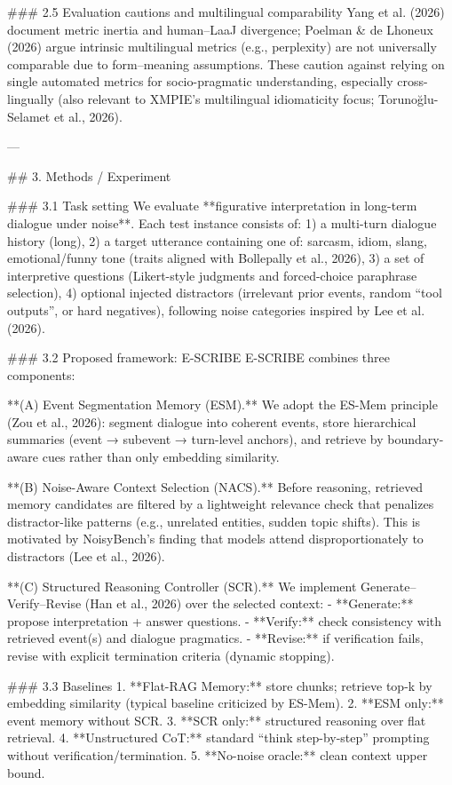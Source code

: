 ### 2.5 Evaluation cautions and multilingual comparability  
Yang et al. (2026) document metric inertia and human–LaaJ divergence; Poelman & de Lhoneux (2026) argue intrinsic multilingual metrics (e.g., perplexity) are not universally comparable due to form–meaning assumptions. These caution against relying on single automated metrics for socio-pragmatic understanding, especially cross-lingually (also relevant to XMPIE’s multilingual idiomaticity focus; Torunoğlu-Selamet et al., 2026).

---

## 3. Methods / Experiment  

### 3.1 Task setting  
We evaluate **figurative interpretation in long-term dialogue under noise**. Each test instance consists of:  
1) a multi-turn dialogue history (long),  
2) a target utterance containing one of: sarcasm, idiom, slang, emotional/funny tone (traits aligned with Bollepally et al., 2026),  
3) a set of interpretive questions (Likert-style judgments and forced-choice paraphrase selection),  
4) optional injected distractors (irrelevant prior events, random “tool outputs”, or hard negatives), following noise categories inspired by Lee et al. (2026).

### 3.2 Proposed framework: E-SCRIBE  
E-SCRIBE combines three components:

**(A) Event Segmentation Memory (ESM).**  
We adopt the ES-Mem principle (Zou et al., 2026): segment dialogue into coherent events, store hierarchical summaries (event → subevent → turn-level anchors), and retrieve by boundary-aware cues rather than only embedding similarity.

**(B) Noise-Aware Context Selection (NACS).**  
Before reasoning, retrieved memory candidates are filtered by a lightweight relevance check that penalizes distractor-like patterns (e.g., unrelated entities, sudden topic shifts). This is motivated by NoisyBench’s finding that models attend disproportionately to distractors (Lee et al., 2026).

**(C) Structured Reasoning Controller (SCR).**  
We implement Generate–Verify–Revise (Han et al., 2026) over the selected context:
- **Generate:** propose interpretation + answer questions.  
- **Verify:** check consistency with retrieved event(s) and dialogue pragmatics.  
- **Revise:** if verification fails, revise with explicit termination criteria (dynamic stopping).

### 3.3 Baselines  
1. **Flat-RAG Memory:** store chunks; retrieve top-k by embedding similarity (typical baseline criticized by ES-Mem).  
2. **ESM only:** event memory without SCR.  
3. **SCR only:** structured reasoning over flat retrieval.  
4. **Unstructured CoT:** standard “think step-by-step” prompting without verification/termination.  
5. **No-noise oracle:** clean context upper bound.

